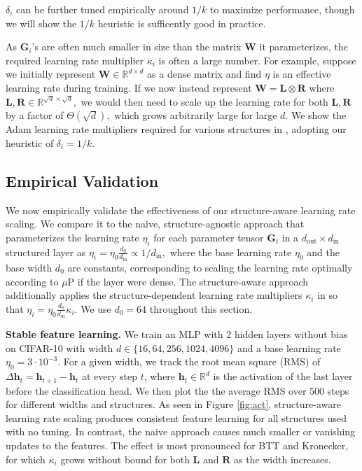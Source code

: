 \documentclass{article}
\newcommand{\mbf}[1]{{\boldsymbol{\mathbf{#1}}}}
\newcommand{\bm}{\mbf}
\theoremstyle{plain}
\theoremstyle{definition}
\theoremstyle{remark}
\newcommand{\mup}{$\mu$P\xspace}
\newcommand{\R}{\mathbb{R}}
\newcommand{\din}{{d_\mathrm{in}}}
\newcommand{\dout}{{d_\mathrm{out}}}
\begin{document}
$\delta_i$ can be further tuned empirically around $1/k$ to maximize performance, though we will show the $1/k$ heuristic is sufficently good in practice.

As $\bm{G}_i$'s are often much smaller in size than the matrix $\bm{W}$ it parameterizes, the required learning rate multiplier $\kappa_i$ is often a large number.
For example, suppose we initially represent $\bm{W} \in \mathbb{R}^{d \times d}$ as a dense matrix and find $\eta$ is an effective learning rate during training. If we now instead represent $\bm{W} = \bm{L} \otimes \bm{R}$ where $\bm{L}, \bm{R} \in \R^{\sqrt{d} \times \sqrt{d}},$
we would then need to scale up the learning rate for both $\bm{L}, \bm{R}$ by a factor of $\Theta(\sqrt{d}),$ which grows arbitrarily large for large $d.$ We show the Adam learning rate multipliers required for various structures in , adopting our heuristic of $\delta_i = 1/k$. 



\subsection{Empirical Validation}
We now empirically validate the effectiveness of our structure-aware learning rate scaling.
%
We compare it to the naive, structure-agnostic approach that parameterizes the learning rate $\eta_i$ for each parameter tensor $\bm{G}_i$ in a $\dout \times \din$ structured layer as $\eta_i = \eta_0 \frac{d_0}{\din} \propto 1/\din,$ where the base learning rate $\eta_0$ and the base width $d_0$ are constants, corresponding to scaling the learning rate optimally according to \mup if the layer were dense. 
The structure-aware approach additionally applies the structure-dependent learning rate multipliers $\kappa_i$ in  so that $\eta_i = \eta_0 \frac{d_0}{\din} \kappa_i.$ We use $d_0 = 64$ throughout this section.


\noindent \textbf{Stable feature learning.} We train an MLP with 2 hidden layers without bias on CIFAR-10 with width $d \in \{16, 64, 256, 1024, 4096\}$ and a base learning rate $\eta_0 = 3 \cdot 10^{-3}$.
For a given width, we track the root mean square (RMS) of $\Delta \bm{h}_{t} = \bm{h}_{t+1} - \bm{h}_{t}$ at every step $t$,
where $\bm{h}_{t} \in \mathbb{R}^{d}$ is the activation of the last layer before the classification head.
We then plot the the average RMS over $500$ steps for different widths and structures.
As seen in Figure \ref{fig:act}, structure-aware learning rate scaling produces consistent feature learning for all structures used with no tuning. In contrast, the naive approach causes much smaller or vanishing updates to the features. The effect is most pronounced for BTT and Kronecker, for which $\kappa_i$ grows without bound for both $\bm{L}$ and $\bm{R}$ as the width increases.
\end{document}
